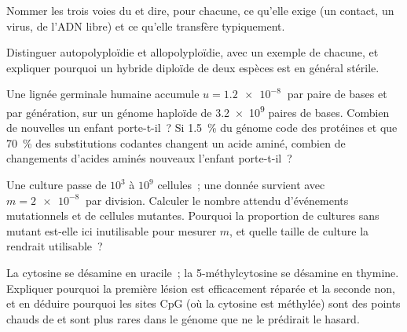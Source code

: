 \begin{exercise}[$\star$]\label{exo:b2:genome-diversification:3}
Nommer les trois voies du  et dire, pour
chacune, ce qu'elle exige (un contact, un virus, de l'ADN libre) et ce
qu'elle transfère typiquement.
\end{exercise}

\begin{exercise}[$\star$]\label{exo:b2:genome-diversification:4}
Distinguer autopolyploïdie et allopolyploïdie, avec un exemple de
chacune, et expliquer pourquoi un hybride diploïde de deux espèces est
en général stérile.
\end{exercise}

\begin{exercise}[$\star\star$]\label{exo:b2:genome-diversification:5}
Une lignée germinale humaine accumule $u = \qty{1.2e-8}{}$  par
paire de bases et par génération, sur un génome haploïde de
\qty{3.2e9}{} paires de bases. Combien de  nouvelles un enfant
porte-t-il~? Si \qty{1.5}{\%} du génome code des protéines et que
\qty{70}{\%} des substitutions codantes changent un acide aminé, combien
de changements d'acides aminés nouveaux l'enfant porte-t-il~?
\end{exercise}

\begin{exercise}[$\star\star$]\label{exo:b2:genome-diversification:6}
Une culture passe de $10^{3}$ à $10^{9}$ cellules~; une  donnée
survient avec $m = \qty{2e-8}{}$ par division. Calculer le nombre
attendu d'événements mutationnels et de cellules mutantes. Pourquoi la
proportion de cultures sans mutant est-elle ici inutilisable pour
mesurer $m$, et quelle taille de culture la rendrait utilisable~?
\end{exercise}

\begin{exercise}[$\star\star$]\label{exo:b2:genome-diversification:7}
La cytosine se désamine en uracile~; la 5-méthylcytosine se désamine en
thymine. Expliquer pourquoi la première lésion est efficacement réparée
et la seconde non, et en déduire pourquoi les sites CpG (où la cytosine
est méthylée) sont des points chauds de  et sont plus rares
dans le génome que ne le prédirait le hasard.
\end{exercise}

